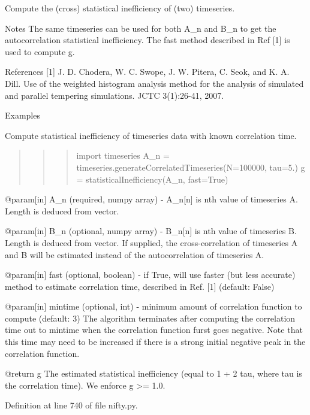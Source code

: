 Compute the (cross) statistical inefficiency of (two) timeseries. 

Notes The same timeseries can be used for both A\+\_\+n and B\+\_\+n to get the autocorrelation statistical inefficiency. The fast method described in Ref \mbox{[}1\mbox{]} is used to compute g.

References \mbox{[}1\mbox{]} J. D. Chodera, W. C. Swope, J. W. Pitera, C. Seok, and K. A. Dill. Use of the weighted histogram analysis method for the analysis of simulated and parallel tempering simulations. J\+C\+TC 3(1)\+:26-\/41, 2007.

Examples

Compute statistical inefficiency of timeseries data with known correlation time.

\begin{quote}
\begin{quote}
\begin{quote}
import timeseries A\+\_\+n = timeseries.\+generate\+Correlated\+Timeseries(N=100000, tau=5.) g = statistical\+Inefficiency(A\+\_\+n, fast=True) \end{quote}
\end{quote}
\end{quote}
\begin{DoxyVerb} @param[in] A_n (required, numpy array) - A_n[n] is nth value of
 timeseries A.  Length is deduced from vector.

 @param[in] B_n (optional, numpy array) - B_n[n] is nth value of
 timeseries B.  Length is deduced from vector.  If supplied, the
 cross-correlation of timeseries A and B will be estimated instead of
 the autocorrelation of timeseries A.

 @param[in] fast (optional, boolean) - if True, will use faster (but
 less accurate) method to estimate correlation time, described in
 Ref. [1] (default: False)

 @param[in] mintime (optional, int) - minimum amount of correlation
 function to compute (default: 3) The algorithm terminates after
 computing the correlation time out to mintime when the correlation
 function furst goes negative.  Note that this time may need to be
 increased if there is a strong initial negative peak in the
 correlation function.

 @return g The estimated statistical inefficiency (equal to 1 + 2
 tau, where tau is the correlation time).  We enforce g >= 1.0.\end{DoxyVerb}
 

Definition at line 740 of file nifty.\+py.

